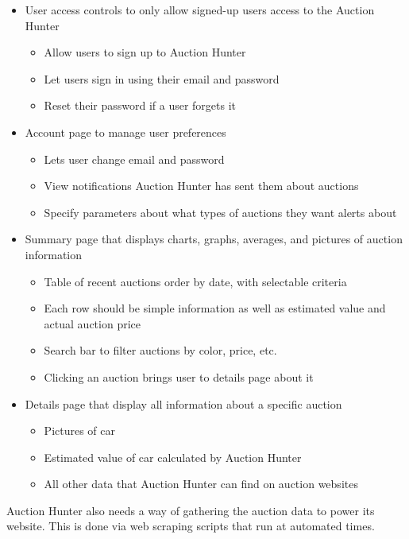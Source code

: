 \documentclass[draftclsnofoot,onecolumn,10pt]{IEEEtran}
\begin{document}
\begin{itemize}
\item User access controls to only allow signed-up users access to the Auction Hunter
\begin{itemize}
    \item Allow users to sign up to Auction Hunter
    \item Let users sign in using their email and password
    \item Reset their password if a user forgets it
\end{itemize}
\item Account page to manage user preferences
\begin{itemize}
    \item Lets user change email and password
    \item View notifications Auction Hunter has sent them about auctions
    \item Specify parameters about what types of auctions they want alerts about
\end{itemize}
\item Summary page that displays charts, graphs, averages, and pictures of auction information
\begin{itemize}
    \item Table of recent auctions order by date, with selectable criteria
    \item Each row should be simple information as well as estimated value and actual auction price
    \item Search bar to filter auctions by color, price, etc.
    \item Clicking an auction brings user to details page about it
\end{itemize}
\item Details page that display all information about a specific auction
\begin{itemize}
    \item Pictures of car
    \item Estimated value of car calculated by Auction Hunter
    \item All other data that Auction Hunter can find on auction websites
\end{itemize}
\end{itemize}

Auction Hunter also needs a way of gathering the auction data to power its website. This is done via web scraping scripts that run at automated times.
\end{document}
